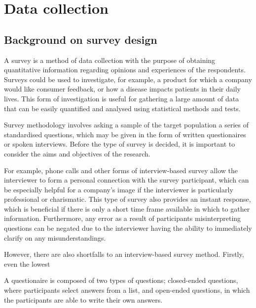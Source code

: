 \chapter{Data collection}

\section{Background on survey design}


A survey is a method of data collection with the purpose of obtaining quantitative information regarding opinions and 
experiences of the respondents. Surveys could be used to investigate, for example, a product for which a company would like 
consumer feedback, or how a disease impacts patients in their daily lives. This form of investigation is useful for gathering a
large amount of data that can be easily quantified and analysed using statistical methods and tests. 

Survey methodology involves asking a sample of the target population a series of standardised questions, which may be given in 
the form of written questionaires or spoken interviews. Before the type of survey is decided, it is important to consider the 
aims and objectives of the research. 

For example, phone calls and other forms of interview-based survey allow the interviewer to form a personal connection with 
the survey participant, which can be especially helpful for a company's image if the interviewer is particularly professional 
or charismatic. This type of survey also provides an instant response, which is beneficial if there is only a short time frame 
available in which to gather information. Furthermore, any error as a result of participants misinterpreting questions can be 
negated due to the interviewer having the ability to immediately clarify on any misunderstandings. 


However, there are also shortfalls to an interview-based survey method. Firstly, even the lowest 




A questionaire is composed of two types of questions; closed-ended questions, where participants select answers from a list,
and open-ended questions, in which the participants are able to write their own answers. 



